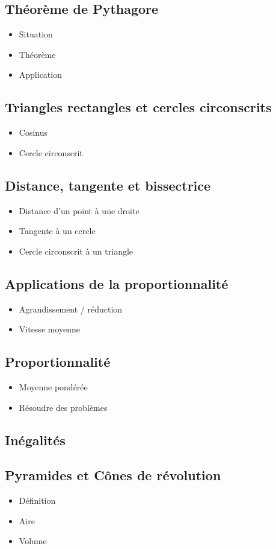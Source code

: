 \subsection{Théorème de Pythagore}
\begin{itemize}
	\item Situation
	\item Théorème
	\item Application
\end{itemize}

\subsection{Triangles rectangles et cercles circonscrits}
\begin{itemize}
	\item Cosinus
	\item Cercle circonscrit
\end{itemize}

\subsection{Distance, tangente et bissectrice}
\begin{itemize}
	\item Distance d'un point à une droite
	\item Tangente à un cercle
	\item Cercle circonscrit à un triangle
\end{itemize}

\subsection{Applications de la proportionnalité}
\begin{itemize}
	\item Agrandissement / réduction
	\item Vitesse moyenne
\end{itemize}
	
\subsection{Proportionnalité}

\begin{itemize}
	\item Moyenne pondérée
	\item Résoudre des problèmes
\end{itemize}

\subsection{Inégalités}

\subsection{Pyramides et Cônes de révolution}

\begin{itemize}
	\item Définition
	\item Aire
	\item Volume
\end{itemize}